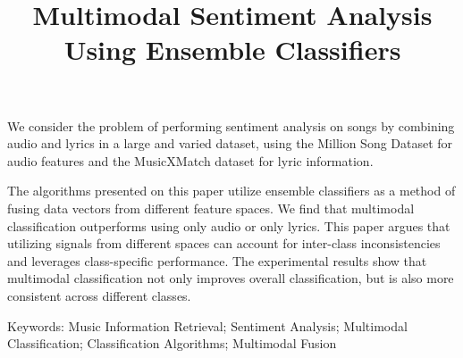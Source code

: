 \title{Multimodal Sentiment Analysis Using Ensemble Classifiers}

We consider the problem of performing sentiment analysis on songs
 by combining audio and lyrics in a large and varied dataset, 
 using the Million Song Dataset for audio features and the 
 MusicXMatch dataset for lyric information. 
 
 The algorithms presented on this paper utilize ensemble classifiers
  as a method of fusing data vectors from different feature spaces.  
  We find that multimodal classification outperforms using only audio 
  or only lyrics. This paper argues that utilizing signals from different 
  spaces can account for inter-class inconsistencies and leverages
   class-specific performance. The experimental results show that 
   multimodal classification not only improves overall classification, 
   but is also more consistent across different classes. 
 


Keywords: Music Information Retrieval; Sentiment Analysis; 
Multimodal Classification; Classification Algorithms; Multimodal Fusion
